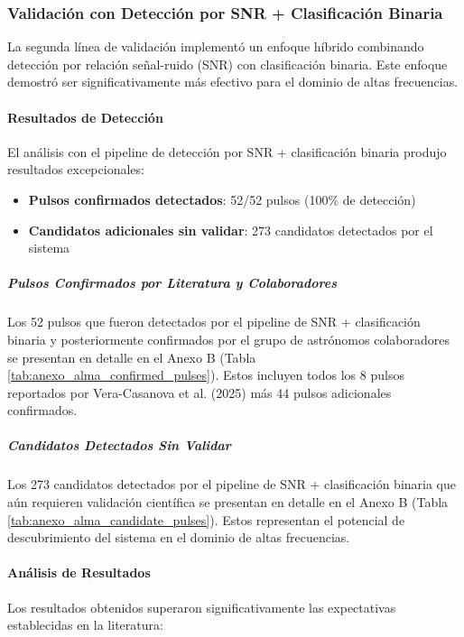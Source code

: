 \subsubsection{Validación con Detección por SNR + Clasificación Binaria}

La segunda línea de validación implementó un enfoque híbrido combinando detección por relación señal-ruido (SNR) con clasificación binaria. Este enfoque demostró ser significativamente más efectivo para el dominio de altas frecuencias.

\paragraph{Resultados de Detección}

El análisis con el pipeline de detección por SNR + clasificación binaria produjo resultados excepcionales:

\begin{itemize}
    \item \textbf{Pulsos confirmados detectados}: 52/52 pulsos (100\% de detección)
    \item \textbf{Candidatos adicionales sin validar}: 273 candidatos detectados por el sistema
\end{itemize}

\subparagraph{Pulsos Confirmados por Literatura y Colaboradores}

Los 52 pulsos que fueron detectados por el pipeline de SNR + clasificación binaria y posteriormente confirmados por el grupo de astrónomos colaboradores se presentan en detalle en el Anexo B (Tabla \ref{tab:anexo_alma_confirmed_pulses}). Estos incluyen todos los 8 pulsos reportados por Vera-Casanova et al. (2025) más 44 pulsos adicionales confirmados.

\subparagraph{Candidatos Detectados Sin Validar}

Los 273 candidatos detectados por el pipeline de SNR + clasificación binaria que aún requieren validación científica se presentan en detalle en el Anexo B (Tabla \ref{tab:anexo_alma_candidate_pulses}). Estos representan el potencial de descubrimiento del sistema en el dominio de altas frecuencias.

\paragraph{Análisis de Resultados}

Los resultados obtenidos superaron significativamente las expectativas establecidas en la literatura:

